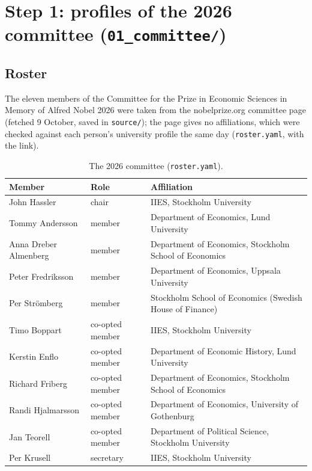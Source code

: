 \documentclass[11pt,a4paper]{article}
\newcommand{\code}[1]{\texttt{#1}}
\begin{document}
\section{Step 1: profiles of the 2026 committee (\code{01\_committee/})}

\subsection{Roster}

The eleven members of the Committee for the Prize in Economic Sciences in Memory of Alfred Nobel 2026 were taken from
the nobelprize.org committee page (fetched 9 October, saved in \code{source/}); the page gives no affiliations, which
were checked against each person's university profile the same day (\code{roster.yaml}, with the link).

\begin{table}[h]
\small
\begin{tabularx}{\textwidth}{@{}llL@{}}
\toprule
Member & Role & Affiliation \\
\midrule
John Hassler & chair & IIES, Stockholm University \\
Tommy Andersson & member & Department of Economics, Lund University \\
Anna Dreber Almenberg & member & Department of Economics, Stockholm School of Economics \\
Peter Fredriksson & member & Department of Economics, Uppsala University \\
Per Strömberg & member & Stockholm School of Economics (Swedish House of Finance) \\
Timo Boppart & co-opted member & IIES, Stockholm University \\
Kerstin Enflo & co-opted member & Department of Economic History, Lund University \\
Richard Friberg & co-opted member & Department of Economics, Stockholm School of Economics \\
Randi Hjalmarsson & co-opted member & Department of Economics, University of Gothenburg \\
Jan Teorell & co-opted member & Department of Political Science, Stockholm University \\
Per Krusell & secretary & IIES, Stockholm University \\
\bottomrule
\end{tabularx}
\caption{The 2026 committee (\code{roster.yaml}).}
\end{table}
\end{document}
